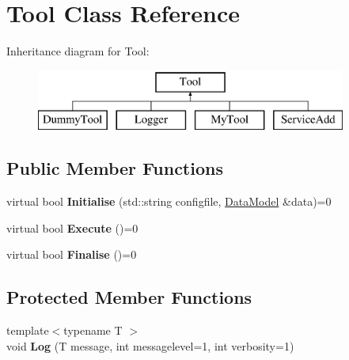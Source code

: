 \hypertarget{classTool}{\section{Tool Class Reference}
\label{classTool}
}
Inheritance diagram for Tool\-:\begin{figure}[H]
\begin{center}
\leavevmode
\includegraphics[height=2.000000cm]{classTool}
\end{center}
\end{figure}
\subsection*{Public Member Functions}
\begin{DoxyCompactItemize}
\item 
\hypertarget{classTool_a4b04a99172dfe09dc97927d1feaff0ce}{virtual bool {\bfseries Initialise} (std\-::string configfile, \hyperlink{classDataModel}{Data\-Model} \&data)=0}\label{classTool_a4b04a99172dfe09dc97927d1feaff0ce}

\item 
\hypertarget{classTool_a6a71469fa4efffd6fb71afbd4941e49d}{virtual bool {\bfseries Execute} ()=0}\label{classTool_a6a71469fa4efffd6fb71afbd4941e49d}

\item 
\hypertarget{classTool_a1f9a82fe5cc9afd63fc8eb3aaf5d80ca}{virtual bool {\bfseries Finalise} ()=0}\label{classTool_a1f9a82fe5cc9afd63fc8eb3aaf5d80ca}

\end{DoxyCompactItemize}
\subsection*{Protected Member Functions}
\begin{DoxyCompactItemize}
\item 
\hypertarget{classTool_a46f7e599888302feefcf25e4f6cb4f9e}{{\footnotesize template$<$typename T $>$ }\\void {\bfseries Log} (T message, int messagelevel=1, int verbosity=1)}\label{classTool_a46f7e599888302feefcf25e4f6cb4f9e}

\end{DoxyCompactItemize}
